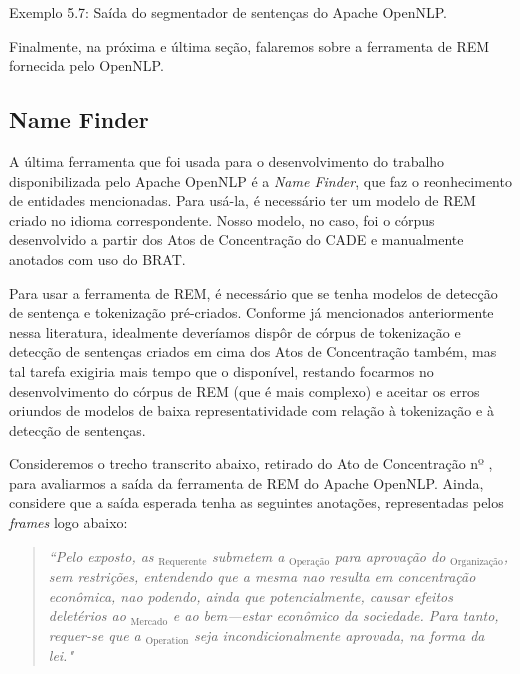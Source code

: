 \documentclass[11pt]{report}
\begin{document}
\begin{quote}
\end{quote}

\begin{center}
  Exemplo 5.7: Saída do segmentador de sentenças do Apache OpenNLP.
\end{center}

Finalmente, na próxima e última seção, falaremos sobre a ferramenta de REM fornecida pelo OpenNLP.

\pagebreak

\subsection{Name Finder}

\indent\indent A última ferramenta que foi usada para o desenvolvimento do trabalho disponibilizada pelo Apache OpenNLP é a \textit{Name Finder}, que faz o
reonhecimento de entidades mencionadas. Para usá-la, é necessário ter um modelo de REM criado no idioma correspondente. Nosso modelo, no caso, foi o córpus desenvolvido
a partir dos Atos de Concentração do CADE e manualmente anotados com uso do BRAT.

Para usar a ferramenta de REM, é necessário que se tenha modelos de detecção de sentença e tokenização pré-criados. Conforme já mencionados anteriormente nessa literatura,
idealmente deveríamos dispôr de córpus de tokenização e detecção de sentenças criados em cima dos Atos de Concentração também, mas tal tarefa exigiria mais tempo que o
disponível, restando focarmos no desenvolvimento do córpus de REM (que é mais complexo) e aceitar os erros oriundos de modelos de baixa representatividade com relação
à tokenização e à detecção de sentenças.

Consideremos o trecho transcrito abaixo, retirado do Ato de Concentração nº , para avaliarmos a saída da ferramenta de REM do Apache OpenNLP. Ainda, considere
que a saída esperada tenha as seguintes anotações, representadas pelos \textit{frames} logo abaixo:

\begin{quote}
  \textit{``Pelo exposto, as }$_{\text{Requerente}}$\textit{ submetem a }$_{\text{Operação}}$\textit{ para aprovação do }$_{\text{Organização}}$\textit{, sem restrições,
  entendendo que a mesma nao resulta em
  concentração econômica, nao podendo, ainda que potencialmente, causar efeitos deletérios ao }$_{\text{Mercado}}$\textit{ e ao bem—estar econômico da sociedade.
  Para tanto, requer-se que a }$_{\text{Operation}}$\textit{ seja incondicionalmente aprovada, na forma da lei."}
\end{quote}
\end{document}
